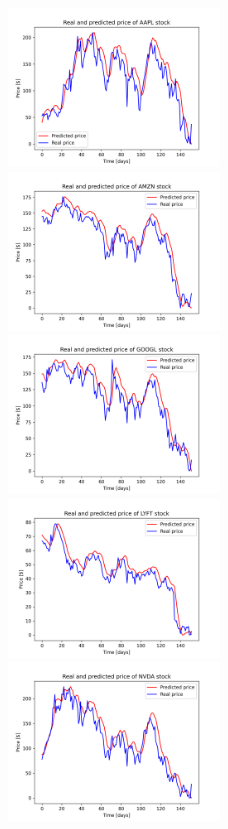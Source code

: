 \begin{figure}
\includegraphics[width=0.5\textwidth]{./graf/model8/AAPL.png}
\includegraphics[width=0.5\textwidth]{./graf/model8/AMZN.png}
\includegraphics[width=0.5\textwidth]{./graf/model8/GOOGL.png}
\includegraphics[width=0.5\textwidth]{./graf/model8/LYFT.png}
\includegraphics[width=0.5\textwidth]{./graf/model8/NVDA.png}

\end{figure}

